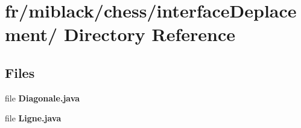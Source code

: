 \section{fr/miblack/chess/interface\-Deplacement/ Directory Reference}
\label{dir_03243d6347e32f2c7a97b580c7a464f9}
\subsection*{Files}
\begin{DoxyCompactItemize}
\item 
file {\bfseries Diagonale.\-java}
\item 
file {\bfseries Ligne.\-java}
\end{DoxyCompactItemize}
